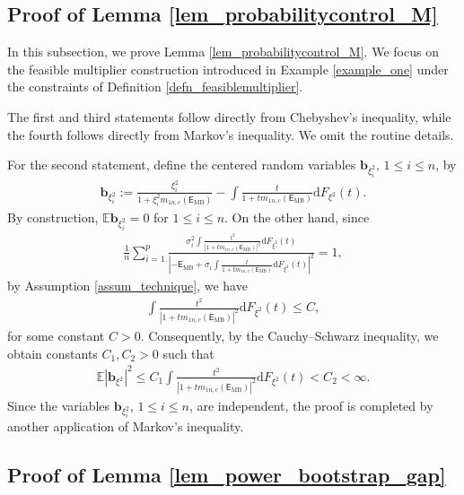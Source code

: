 \documentclass[12pt]{article}
\theoremstyle{plain}
\numberwithin{equation}{section}
\begin{document}
\subsection{Proof of Lemma \ref{lem_probabilitycontrol_M}}\label{sec_prf_Omega_M}
In this subsection, we prove Lemma \ref{lem_probabilitycontrol_M}. We focus on the feasible multiplier construction introduced in Example \ref{example_one} under the constraints of Definition \ref{defn_feasiblemultiplier}.

The first and third statements follow directly from Chebyshev's inequality, while the fourth follows directly from Markov's inequality. We omit the routine details. 

For the second statement, define the centered random variables $\mathbf{b}_{\xi^2_i}$, $1\leq i\leq n$, by
\begin{gather*}
	\mathbf{b}_{\xi^2_i}:=\frac{\xi^2_i}{1+\xi^2_im_{1n,c}(\mathsf{E}_{\mathrm{MB}})}-\int\frac{t}{1+tm_{1n,c}(\mathsf{E}_{\mathrm{MB}})}\mathrm{d}F_{\xi^2}(t).
\end{gather*}
By construction, $\mathbb{E}\mathbf{b}_{\xi^2_i}=0$ for $1\le i\le n$. On the other hand, since
\begin{align*}
	\frac{1}{n} \sum_{i=1}^p \frac{\sigma_i^2 \int \frac{t^2}{|1+t m_{1n,c}(\mathsf{E}_{\mathrm{MB}})|^2} \mathrm{d} F_{\xi^2}(t) }{|-\mathsf{E}_{\mathrm{MB}}+\sigma_i \int \frac{t}{1+t m_{1n,c}(\mathsf{E}_{\mathrm{MB}})} \mathrm{d} F_{\xi^2}(t)|^2}=1,
\end{align*}
by Assumption \ref{assum_technique}, we have
\begin{align*}
	\int \frac{t^2}{|1+t m_{1n,c}(\mathsf{E}_{\mathrm{MB}})|^2} \mathrm{d} F_{\xi^2}(t)\le C,
\end{align*}
for some constant $C>0$. Consequently, by the Cauchy--Schwarz inequality, we obtain constants $C_1, C_2>0$ such that
\begin{gather*}
	\mathbb{E}|\mathbf{b}_{\xi^2}|^2\leq C_1  \int\frac{t^2}{|1+tm_{1n,c}(\mathsf{E}_{\mathrm{MB}})|^2}\mathrm{d}F_{\xi^2}(t) < C_2<\infty. 
\end{gather*}
Since the variables $\mathbf{b}_{\xi_i^2}$, $1 \leq i \leq n$, are independent, the proof is completed by another application of Markov's inequality.


\subsection{Proof of Lemma \ref{lem_power_bootstrap_gap}}\label{sec_proof_lemma_bootstrapgap}
\end{document}
